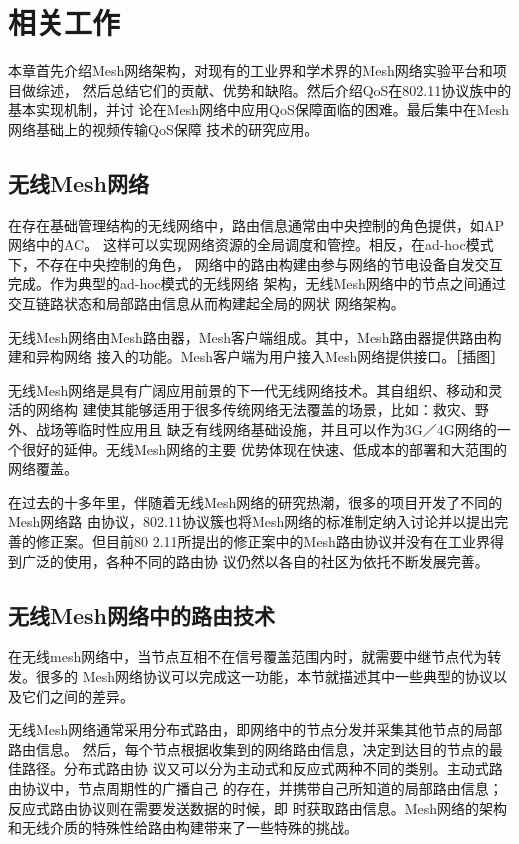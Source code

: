 \chapter{相关工作}
\label{cha:related_work}
本章首先介绍Mesh网络架构，对现有的工业界和学术界的Mesh网络实验平台和项目做综述，
然后总结它们的贡献、优势和缺陷。然后介绍QoS在802.11协议族中的基本实现机制，并讨
论在Mesh网络中应用QoS保障面临的困难。最后集中在Mesh网络基础上的视频传输QoS保障
技术的研究应用。

\section{无线Mesh网络}
在存在基础管理结构的无线网络中，路由信息通常由中央控制的角色提供，如AP网络中的AC。
这样可以实现网络资源的全局调度和管控。相反，在ad-hoc模式下，不存在中央控制的角色，
网络中的路由构建由参与网络的节电设备自发交互完成。作为典型的ad-hoc模式的无线网络
架构，无线Mesh网络中的节点之间通过交互链路状态和局部路由信息从而构建起全局的网状
网络架构。

无线Mesh网络由Mesh路由器，Mesh客户端组成。其中，Mesh路由器提供路由构建和异构网络
接入的功能。Mesh客户端为用户接入Mesh网络提供接口。［插图］

无线Mesh网络是具有广阔应用前景的下一代无线网络技术。其自组织、移动和灵活的网络构
建使其能够适用于很多传统网络无法覆盖的场景，比如：救灾、野外、战场等临时性应用且
缺乏有线网络基础设施，并且可以作为3G／4G网络的一个很好的延伸。无线Mesh网络的主要
优势体现在快速、低成本的部署和大范围的网络覆盖。

在过去的十多年里，伴随着无线Mesh网络的研究热潮，很多的项目开发了不同的Mesh网络路
由协议，802.11协议簇也将Mesh网络的标准制定纳入讨论并以提出完善的修正案。但目前80
2.11所提出的修正案中的Mesh路由协议并没有在工业界得到广泛的使用，各种不同的路由协
议仍然以各自的社区为依托不断发展完善。

\section{无线Mesh网络中的路由技术}
在无线mesh网络中，当节点互相不在信号覆盖范围内时，就需要中继节点代为转发。很多的
Mesh网络协议可以完成这一功能，本节就描述其中一些典型的协议以及它们之间的差异。

无线Mesh网络通常采用分布式路由，即网络中的节点分发并采集其他节点的局部路由信息。
然后，每个节点根据收集到的网络路由信息，决定到达目的节点的最佳路径。分布式路由协
议又可以分为主动式和反应式两种不同的类别。主动式路由协议中，节点周期性的广播自己
的存在，并携带自己所知道的局部路由信息；反应式路由协议则在需要发送数据的时候，即
时获取路由信息。Mesh网络的架构和无线介质的特殊性给路由构建带来了一些特殊的挑战。


